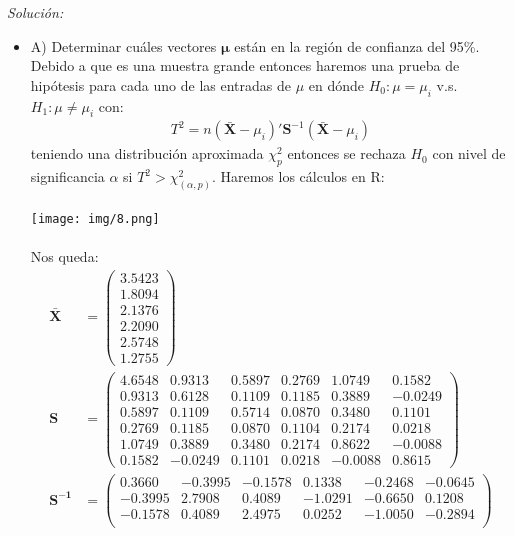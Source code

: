 \documentclass[12pt]{article}
\newenvironment{sol}
    {\emph{Solución:}
    }
    {
    }
\begin{document}
\begin{sol}
\begin{itemize}
\item A) Determinar cuáles vectores $\mathbf{\mu}$ están en la región de confianza del 95\%. \\
Debido a que es una muestra grande entonces haremos una prueba de hipótesis para cada uno de las entradas de $\mu$ en dónde $H_0 : \mu = \mu_i$ v.s. $H_1:\mu \neq \mu_i$ con: 
\begin{align*}
T^2 = n (\mathbf{\bar{X}} - \mu_i)' \mathbf{S}^{-1} (\mathbf{\bar{X}} - \mu_i)
\end{align*}
teniendo una distribución aproximada $\chi_p^2$ entonces se rechaza $H_0$ con nivel de significancia $\alpha$ si $T^2 > \chi_{(\alpha,p)}^2$. Haremos los cálculos en R:\\\\
\texttt{[image: img/8.png]}\\\\
Nos queda: 
\begin{align*}
\mathbf{\bar{X}} &=
\begin{pmatrix} 
  3.5423 \\ 
  1.8094 \\ 
  2.1376 \\ 
  2.2090 \\ 
  2.5748 \\ 
  1.2755 
\end{pmatrix} \\
\mathbf{S} &=
\begin{pmatrix}
  4.6548 &  0.9313 &  0.5897 &  0.2769 &  1.0749 &  0.1582 \\
  0.9313 &  0.6128 &  0.1109 &  0.1185 &  0.3889 & -0.0249 \\
  0.5897 &  0.1109 &  0.5714 &  0.0870 &  0.3480 &  0.1101 \\
  0.2769 &  0.1185 &  0.0870 &  0.1104 &  0.2174 &  0.0218 \\
  1.0749 &  0.3889 &  0.3480 &  0.2174 &  0.8622 & -0.0088 \\
  0.1582 & -0.0249 &  0.1101 &  0.0218 & -0.0088 &  0.8615
\end{pmatrix} \\
\mathbf{S^{-1}} &=
\begin{pmatrix}
  0.3660 & -0.3995 & -0.1578 &  0.1338 & -0.2468 & -0.0645 \\
 -0.3995 &  2.7908 &  0.4089 & -1.0291 & -0.6650 &  0.1208 \\
 -0.1578 &  0.4089 &  2.4975 &  0.0252 & -1.0050 & -0.2894 \\

\end{pmatrix}
\end{align*}
\end{itemize}
\end{sol}
\end{document}
